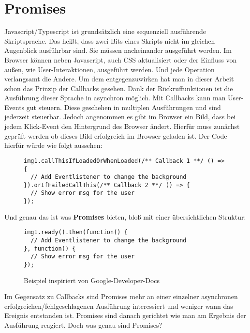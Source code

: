 \section{Promises}

Javascript/Typescript ist grundsätzlich eine sequenziell ausführende Skriptsprache. Das heißt,  dass zwei Bits eines Skripts nicht im gleichen Augenblick ausführbar sind. Sie müssen nacheinander ausgeführt werden. Im Browser können neben Javascript, auch CSS aktualisiert oder der Einfluss von außen, wie User-Interaktionen, ausgeführt werden. Und jede Operation verlangsamt die Andere. Um dem entgegenzuwirken hat man in dieser Arbeit schon das Prinzip der Callbacks gesehen. Dank der Rückruffunktionen ist die Ausführung dieser Sprache in asynchron möglich. Mit Callbacks kann man User-Events gut steuern. Diese geschehen in multiplen Ausführungen und sind jederzeit steuerbar. Jedoch angenommen es gibt im Browser ein Bild, dass bei jedem Klick-Event den Hintergrund des Browser ändert. Hierfür muss zunächst geprüft werden ob dieses Bild erfolgreich im Browser geladen ist. 
Der Code hierfür würde wie folgt aussehen:

\begin{figure}[H]
\begin{lstlisting}
img1.callThisIfLoadedOrWhenLoaded(/** Callback 1 **/ () => {
  // Add Eventlistener to change the background
}).orIfFailedCallThis(/** Callback 2 **/ () => {
  // Show error msg for the user
});
\end{lstlisting}
\end{figure}

\noindent
Und genau das ist was \textbf{Promises} bieten, bloß mit einer übersichtlichen Struktur:

\begin{figure}[H]
\begin{lstlisting}
img1.ready().then(function() {
  // Add Eventlistener to change the background
}, function() {
  // Show error msg for the user
});
\end{lstlisting}
\caption{Beispiel inspiriert von Google-Developer-Docs \cite{callback-vs-promises}}
\end{figure}

\noindent
Im Gegensatz zu Callbacks sind Promises mehr an einer einzelner asynchronen erfolgreichen/fehlgeschlagenen Ausführung interessiert und weniger wann das Ereignis entstanden ist. Promises sind danach gerichtet wie man am Ergebnis der Ausführung reagiert. 
Doch was genau sind Promises? \\

